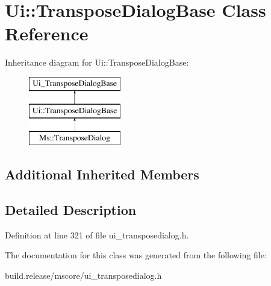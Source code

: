 \hypertarget{class_ui_1_1_transpose_dialog_base}{}\section{Ui\+:\+:Transpose\+Dialog\+Base Class Reference}
\label{class_ui_1_1_transpose_dialog_base}
Inheritance diagram for Ui\+:\+:Transpose\+Dialog\+Base\+:\begin{figure}[H]
\begin{center}
\leavevmode
\includegraphics[height=3.000000cm]{class_ui_1_1_transpose_dialog_base}
\end{center}
\end{figure}
\subsection*{Additional Inherited Members}


\subsection{Detailed Description}


Definition at line 321 of file ui\+\_\+transposedialog.\+h.



The documentation for this class was generated from the following file\+:\begin{DoxyCompactItemize}
\item 
build.\+release/mscore/ui\+\_\+transposedialog.\+h\end{DoxyCompactItemize}

